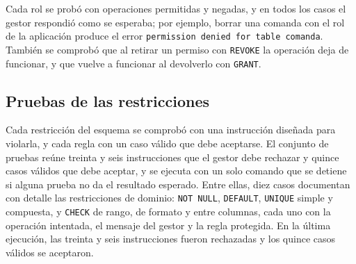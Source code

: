 Cada rol se probó con operaciones permitidas y negadas, y en todos los casos el gestor respondió como se esperaba; por ejemplo, borrar una comanda con el rol de la aplicación produce el error \texttt{permission denied for table comanda}. También se comprobó que al retirar un permiso con \texttt{REVOKE} la operación deja de funcionar, y que vuelve a funcionar al devolverlo con \texttt{GRANT}.

\subsection{Pruebas de las restricciones}

Cada restricción del esquema se comprobó con una instrucción diseñada para violarla, y cada regla con un caso válido que debe aceptarse. El conjunto de pruebas reúne treinta y seis instrucciones que el gestor debe rechazar y quince casos válidos que debe aceptar, y se ejecuta con un solo comando que se detiene si alguna prueba no da el resultado esperado. Entre ellas, diez casos documentan con detalle las restricciones de dominio: \texttt{NOT NULL}, \texttt{DEFAULT}, \texttt{UNIQUE} simple y compuesta, y \texttt{CHECK} de rango, de formato y entre columnas, cada uno con la operación intentada, el mensaje del gestor y la regla protegida. En la última ejecución, las treinta y seis instrucciones fueron rechazadas y los quince casos válidos se aceptaron.
